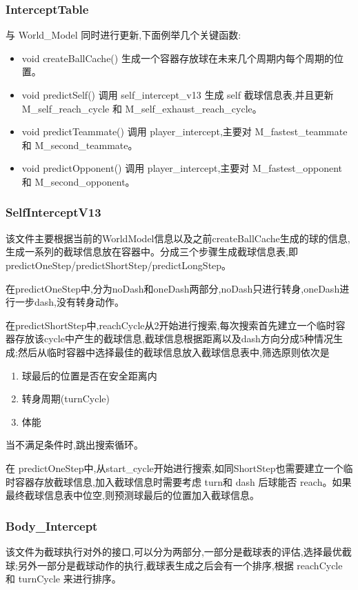 \subsubsection{InterceptTable}
与 World_Model 同时进行更新,下面例举几个关键函数:
\begin{itemize}
	\item void createBallCache() 生成一个容器存放球在未来几个周期内每个周期的位置。
	\item void predictSelf() 调用 self_intercept_v13 生成 self 截球信息表,并且更新 M_self_reach_cycle 和 M_self_exhaust_reach_cycle。
	\item void predictTeammate() 调用 player_intercept,主要对 M_fastest_teammate 和 M_second_teammate。
	\item void predictOpponent() 调用 player_intercept,主要对 M_fastest_opponent 和 M_second_opponent。
\end{itemize}



\subsubsection{SelfInterceptV13}
该文件主要根据当前的WorldModel信息以及之前createBallCache生成的球的信息,生成一系列的截球信息放在容器中。分成三个步骤生成截球信息表,即 predictOneStep/predictShortStep/predictLongStep。

在predictOneStep中,分为noDash和oneDash两部分,noDash只进行转身,oneDash进行一步dash,没有转身动作。

在predictShortStep中,reachCycle从2开始进行搜索,每次搜索首先建立一个临时容器存放该cycle中产生的截球信息,截球信息根据距离以及dash方向分成5种情况生成;然后从临时容器中选择最佳的截球信息放入截球信息表中,筛选原则依次是

\begin{enumerate}
	\item 球最后的位置是否在安全距离内	
	\item 转身周期(turnCycle)
	\item 体能
\end{enumerate}


当不满足条件时,跳出搜索循环。

在 predictOneStep中,从start_cycle开始进行搜索,如同ShortStep也需要建立一个临时容器存放截球信息,加入截球信息时需要考虑 turn和 dash 后球能否 reach。如果最终截球信息表中位空,则预测球最后的位置加入截球信息。


\subsubsection{Body_Intercept}
该文件为截球执行对外的接口,可以分为两部分,一部分是截球表的评估,选择最优截球;另外一部分是截球动作的执行,截球表生成之后会有一个排序,根据 reachCycle 和 turnCycle 来进行排序。

